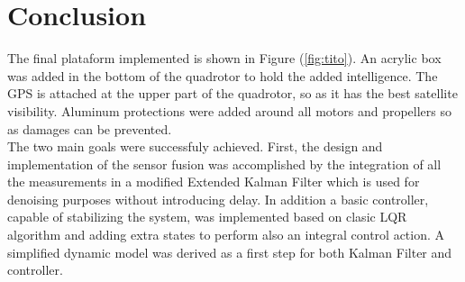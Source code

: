 \documentclass[conference]{IEEEtran}
\newcommand{\refp}[1]{(\ref{#1})}
\begin{document}
%





\section{Conclusion}
\balance
The final plataform implemented is shown in Figure \refp{fig:tito}. An acrylic box was added in the bottom of the quadrotor to hold the added intelligence. The GPS is attached at the upper part of the quadrotor, so as it has the best satellite visibility. Aluminum protections were added around all motors and propellers so as damages can be prevented.\\

The two main goals were successfuly achieved. First, the design and implementation of the sensor fusion was accomplished by the integration of all the measurements in a modified Extended Kalman Filter which is used for denoising purposes without introducing delay. In addition a basic controller, capable of stabilizing the system, was implemented based on clasic LQR algorithm and adding extra states to perform also an integral control action. A simplified dynamic model was derived as a first step for both Kalman Filter and controller. \\
\end{document}

